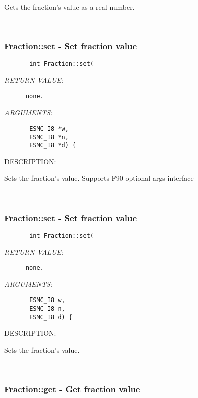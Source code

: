        Gets the fraction's value as a real number.
   
 
\mbox{}\hrulefill\ 
 
\subsubsection [Fraction::set] {Fraction::set - Set fraction value}


  
\begin{verbatim}       int Fraction::set(\end{verbatim}{\em RETURN VALUE:}
\begin{verbatim}      none.\end{verbatim}{\em ARGUMENTS:}
\begin{verbatim}       ESMC_I8 *w,
       ESMC_I8 *n,
       ESMC_I8 *d) {\end{verbatim}
{\sf DESCRIPTION:\\ }


       Sets the fraction's value.  Supports F90 optional args interface
   
 
\mbox{}\hrulefill\ 
 
\subsubsection [Fraction::set] {Fraction::set - Set fraction value}


  
\begin{verbatim}       int Fraction::set(\end{verbatim}{\em RETURN VALUE:}
\begin{verbatim}      none.\end{verbatim}{\em ARGUMENTS:}
\begin{verbatim}       ESMC_I8 w,
       ESMC_I8 n,
       ESMC_I8 d) {\end{verbatim}
{\sf DESCRIPTION:\\ }


       Sets the fraction's value.
   
 
\mbox{}\hrulefill\ 
 
\subsubsection [Fraction::get] {Fraction::get - Get fraction value}



